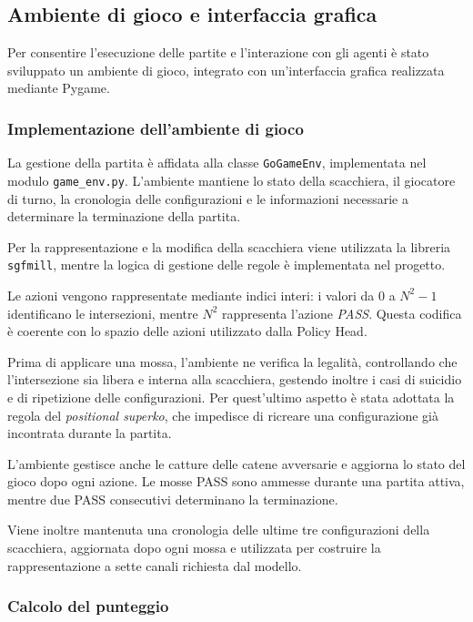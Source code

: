 \subsection{Ambiente di gioco e interfaccia grafica}

Per consentire l'esecuzione delle partite e l'interazione con gli agenti è stato sviluppato un ambiente di gioco, integrato con un'interfaccia grafica realizzata mediante Pygame.

\subsubsection{Implementazione dell'ambiente di gioco}

La gestione della partita è affidata alla classe \texttt{GoGameEnv}, implementata nel modulo \texttt{game\_env.py}. L'ambiente mantiene lo stato della scacchiera, il giocatore di turno, la cronologia delle configurazioni e le informazioni necessarie a determinare la terminazione della partita.

Per la rappresentazione e la modifica della scacchiera viene utilizzata la libreria \texttt{sgfmill}, mentre la logica di gestione delle regole è implementata nel progetto.

Le azioni vengono rappresentate mediante indici interi: i valori da \(0\) a \(N^2-1\) identificano le intersezioni, mentre \(N^2\) rappresenta l'azione \textit{PASS}. Questa codifica è coerente con lo spazio delle azioni utilizzato dalla Policy Head.

Prima di applicare una mossa, l'ambiente ne verifica la legalità, controllando che l'intersezione sia libera e interna alla scacchiera, gestendo inoltre i casi di suicidio e di ripetizione delle configurazioni. Per quest'ultimo aspetto è stata adottata la regola del \textit{positional superko}, che impedisce di ricreare una configurazione già incontrata durante la partita.

L'ambiente gestisce anche le catture delle catene avversarie e aggiorna lo stato del gioco dopo ogni azione. Le mosse PASS sono ammesse durante una partita attiva, mentre due PASS consecutivi determinano la terminazione.

Viene inoltre mantenuta una cronologia delle ultime tre configurazioni della scacchiera, aggiornata dopo ogni mossa e utilizzata per costruire la rappresentazione a sette canali richiesta dal modello.

\subsubsection{Calcolo del punteggio}

